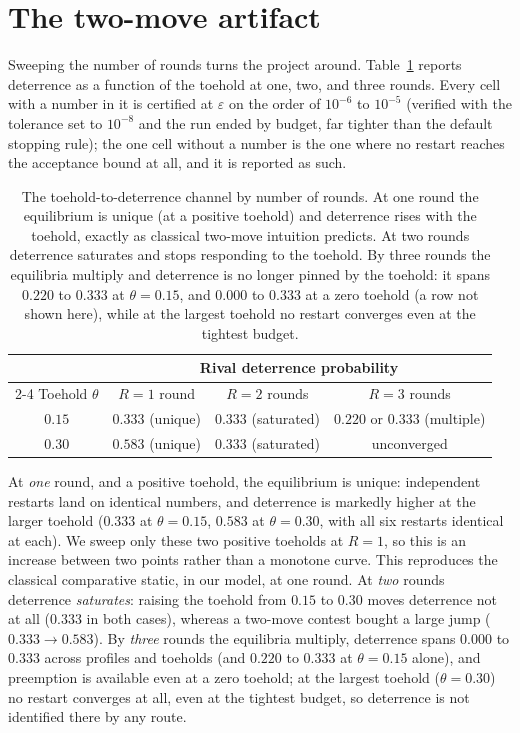 \documentclass[11pt,a4paper]{article}
\newcommand{\theold}{\theta}   %
\begin{document}
\section{The two-move artifact}

Sweeping the number of rounds turns the project around. Table~\ref{tab:rounds} reports deterrence as a function of the toehold at one, two, and three rounds. Every cell with a number in it is certified at $\varepsilon$ on the order of $10^{-6}$ to $10^{-5}$ (verified with the tolerance set to $10^{-8}$ and the run ended by budget, far tighter than the default stopping rule); the one cell without a number is the one where no restart reaches the acceptance bound at all, and it is reported as such.

\begin{table}[H]
\centering
\small
\begin{tabular}{cccc}
\toprule
& \multicolumn{3}{c}{Rival deterrence probability} \\
\cmidrule(lr){2-4}
Toehold $\theold$ & $R=1$ round & $R=2$ rounds & $R=3$ rounds \\
\midrule
$0.15$ & $0.333$ (unique) & $0.333$ (saturated) & $0.220$ or $0.333$ (multiple) \\
$0.30$ & $0.583$ (unique) & $0.333$ (saturated) & unconverged \\
\bottomrule
\end{tabular}
\caption{The toehold-to-deterrence channel by number of rounds. At one round the equilibrium is unique (at a positive toehold) and deterrence rises with the toehold, exactly as classical two-move intuition predicts. At two rounds deterrence saturates and stops responding to the toehold. By three rounds the equilibria multiply and deterrence is no longer pinned by the toehold: it spans $0.220$ to $0.333$ at $\theold=0.15$, and $0.000$ to $0.333$ at a zero toehold (a row not shown here), while at the largest toehold no restart converges even at the tightest budget.}
\label{tab:rounds}
\end{table}

At \emph{one} round, and a positive toehold, the equilibrium is unique: independent restarts land on identical numbers, and deterrence is markedly higher at the larger toehold ($0.333$ at $\theold=0.15$, $0.583$ at $\theold=0.30$, with all six restarts identical at each). We sweep only these two positive toeholds at $R=1$, so this is an increase between two points rather than a monotone curve. This reproduces the classical comparative static, in our model, at one round. At \emph{two} rounds deterrence \emph{saturates}: raising the toehold from $0.15$ to $0.30$ moves deterrence not at all ($0.333$ in both cases), whereas a two-move contest bought a large jump ($0.333\to0.583$). By \emph{three} rounds the equilibria multiply, deterrence spans $0.000$ to $0.333$ across profiles and toeholds (and $0.220$ to $0.333$ at $\theold=0.15$ alone), and preemption is available even at a zero toehold; at the largest toehold ($\theold=0.30$) no restart converges at all, even at the tightest budget, so deterrence is not identified there by any route.
\end{document}

